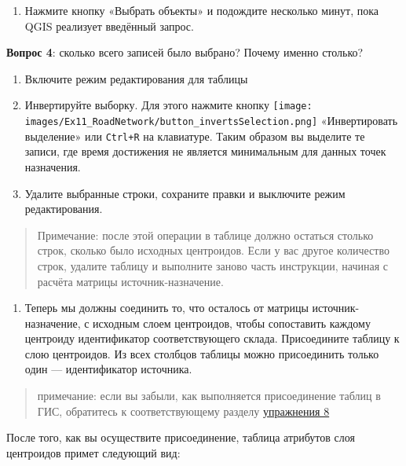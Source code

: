 \documentclass[
  12pt,
]{book}
\providecommand{\tightlist}{%
  \setlength{\itemsep}{0pt}\setlength{\parskip}{0pt}}
\begin{document}
\begin{enumerate}
\def\labelenumi{\arabic{enumi}.}
\setcounter{enumi}{5}
\tightlist
\item
  Нажмите кнопку «Выбрать объекты» и подождите несколько минут, пока QGIS реализует введённый запрос.
\end{enumerate}

\textbf{Вопрос 4}: сколько всего записей было выбрано? Почему именно столько?

\begin{enumerate}
\def\labelenumi{\arabic{enumi}.}
\setcounter{enumi}{6}
\item
  Включите режим редактирования для таблицы
\item
  Инвертируйте выборку. Для этого нажмите кнопку \texttt{[image: images/Ex11\_RoadNetwork/button\_invertsSelection.png]} «Инвертировать выделение» или \texttt{Ctrl+R} на клавиатуре. Таким образом вы выделите те записи, где время достижения не является минимальным для данных точек назначения.
\item
  Удалите выбранные строки, сохраните правки и выключите режим редактирования.
\end{enumerate}

\begin{quote}
Примечание: после этой операции в таблице должно остаться столько строк, сколько было исходных центроидов. Если у вас другое количество строк, удалите таблицу и выполните заново часть инструкции, начиная с расчёта матрицы источник-назначение.
\end{quote}

\begin{enumerate}
\def\labelenumi{\arabic{enumi}.}
\setcounter{enumi}{9}
\tightlist
\item
  Теперь мы должны соединить то, что осталось от матрицы источник-назначение, с исходным слоем центроидов, чтобы сопоставить каждому центроиду идентификатор соответствующего склада. Присоедините таблицу к слою центроидов. Из всех столбцов таблицы можно присоединить только один --- идентификатор источника.
\end{enumerate}

\begin{quote}
примечание: если вы забыли, как выполняется присоединение таблиц в ГИС, обратитесь к соответствующему разделу \protect\hyperlink{overlay-join}{упражнения 8}
\end{quote}

После того, как вы осуществите присоединение, таблица атрибутов слоя центроидов примет следующий вид:
\end{document}
